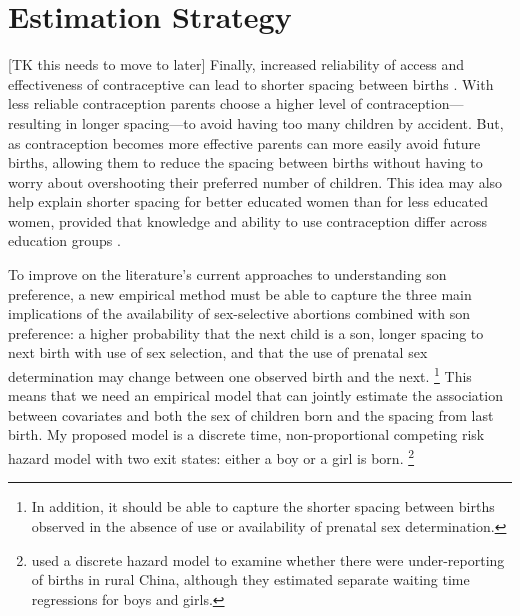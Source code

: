 \documentclass[12pt,letterpaper]{article}
\begin{document}


\section{Estimation Strategy\label{sec:strategy}}


[TK this needs to move to later]
Finally, increased reliability of access and effectiveness of
contraceptive can lead to shorter spacing between births 
\citep{Keyfitz1971,Heckman1976}.
With less reliable contraception parents choose a higher level 
of contraception---resulting in longer spacing---to avoid having 
too many children by accident.
But, as contraception becomes more effective parents can more
easily avoid future births, allowing them to reduce the spacing 
between births without having to worry about overshooting their 
preferred number of children.
This idea may also help explain shorter spacing for better 
educated women than for less educated women, provided that   
knowledge and ability to use contraception differ
across education groups \citep{Tulasidhar1993,Whitworth2002}.


To improve on the literature's current approaches to understanding 
son preference, a new empirical method must be able to capture the 
three main implications of the availability of sex-selective abortions
combined with son preference:
a higher probability that the next child is a son, 
longer spacing to next birth with use of sex selection, 
and that the use of prenatal sex determination may change between 
one observed birth and the next.%
\footnote{
In addition, it should be able to capture the shorter spacing between
births observed in the absence of use or availability of prenatal 
sex determination.
}
This means that we need an empirical model that can jointly estimate 
the association between covariates and both the sex of children born 
and the spacing from last birth. 
My proposed model is a discrete time, non-proportional competing risk 
hazard model with two exit states: either a boy or a girl is born.%
\footnote{
\cite{Merli2000} used a discrete hazard model to examine whether 
there were under-reporting of births in rural China, although they 
estimated separate waiting time regressions for boys and girls.
}
\end{document}
